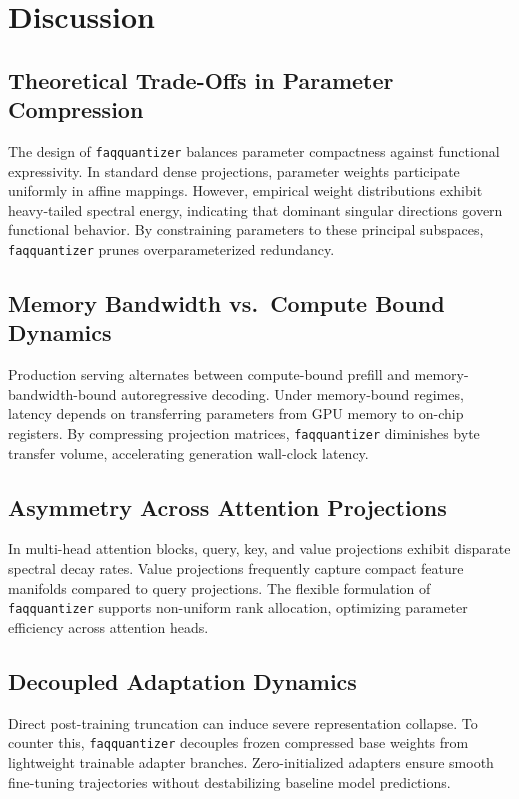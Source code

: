 \section{Discussion}

\subsection{Theoretical Trade-Offs in Parameter Compression}
The design of \texttt{faqquantizer} balances parameter compactness against functional expressivity. In standard dense projections, parameter weights participate uniformly in affine mappings. However, empirical weight distributions exhibit heavy-tailed spectral energy, indicating that dominant singular directions govern functional behavior. By constraining parameters to these principal subspaces, \texttt{faqquantizer} prunes overparameterized redundancy.

\subsection{Memory Bandwidth vs.\ Compute Bound Dynamics}
Production serving alternates between compute-bound prefill and memory-bandwidth-bound autoregressive decoding. Under memory-bound regimes, latency depends on transferring parameters from GPU memory to on-chip registers. By compressing projection matrices, \texttt{faqquantizer} diminishes byte transfer volume, accelerating generation wall-clock latency.

\subsection{Asymmetry Across Attention Projections}
In multi-head attention blocks, query, key, and value projections exhibit disparate spectral decay rates. Value projections frequently capture compact feature manifolds compared to query projections. The flexible formulation of \texttt{faqquantizer} supports non-uniform rank allocation, optimizing parameter efficiency across attention heads.

\subsection{Decoupled Adaptation Dynamics}
Direct post-training truncation can induce severe representation collapse. To counter this, \texttt{faqquantizer} decouples frozen compressed base weights from lightweight trainable adapter branches. Zero-initialized adapters ensure smooth fine-tuning trajectories without destabilizing baseline model predictions.

